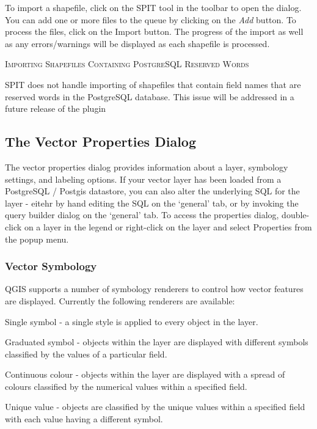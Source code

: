 \documentclass[10pt,english]{article}
\newcommand\qgistip[1]{\raggedright\small{#1}}
\begin{document}
\begin{onehalfspace}
To import a shapefile, click on the SPIT tool in the toolbar to open the dialog. You can add one or more files to the queue by clicking on the \textsl{Add} button. To process the files, click on the Import button. The progress of the import as well as any errors/warnings will be displayed as each shapefile is processed.
\begin{Tip}\caption{\textsc{Importing Shapefiles Containing PostgreSQL Reserved Words}}
\qgistip{SPIT does not handle importing of shapefiles that contain field names that are reserved words in the PostgreSQL database. This issue will be addressed in a future release of the plugin
}
\end{Tip} 
\subsection{The Vector Properties Dialog}
The vector properties dialog provides information about a layer, symbology settings, and labeling options. If your vector layer has been loaded from a PostgreSQL / Postgis datastore, you can also alter the underlying SQL for  the layer - eitehr by hand editing the SQL on the `general' tab, or by invoking the query builder dialog on the `general' tab. To access the properties dialog, double-click on a layer in the legend or right-click on the layer and select Properties from the popup menu.

\subsubsection{Vector Symbology}\label{sec:symbology}

QGIS supports a number of symbology renderers to control how
vector features are displayed. Currently the following renderers
are available:

\begin{compactdesc}
    \item[Single symbol] - a single style is applied to every
    object in the layer.
    \item[Graduated symbol] - objects within the layer are
    displayed with different symbols classified by the values of a
    particular field.
    \item[Continuous colour] - objects within the layer are
    displayed with a spread of colours classified by the numerical
    values within a specified field.
    \item[Unique value] - objects are classified by the unique
    values within a specified field with each value having a
    different symbol.
\end{compactdesc}


\end{onehalfspace}
\end{document}
